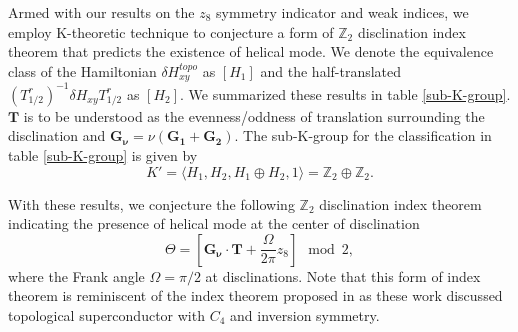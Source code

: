 

Armed with our results on the $z_8$ symmetry indicator and weak indices, we employ K-theoretic technique to conjecture a form of $\mathbb{Z}_2$ disclination index theorem that predicts the existence of helical mode. We denote the equivalence class of the Hamiltonian $\delta H_{xy}^{topo}$ as $[ H_1 ]$ and the half-translated $(T_{1/2}^{r})^{-1} \delta H_{xy} T_{1/2}^r$ as $[ H_2 ]$. We summarized these results in table \ref{sub-K-group}. $\mathbf{T}$ is to be understood as the evenness/oddness of translation surrounding the disclination and $\mathbf{G_{\nu}} = \nu (\mathbf{G_1} + \mathbf{G_2})$. The sub-K-group for the classification in table \ref{sub-K-group} is given by
\begin{equation}
    K' = \langle H_1, H_2, H_1 \oplus H_2, 1 \rangle = \mathbb{Z}_2 \oplus \mathbb{Z}_2 .
\end{equation}

With these results, we conjecture the following $\mathbb{Z}_2$ disclination index theorem indicating the presence of helical mode at the center of disclination
\begin{equation}
    \Theta = \left[ \mathbf{G_{\nu}} \cdot \mathbf{T} + \frac{\Omega}{2 \pi} z_8 \right] \mod 2 ,
\end{equation}
where the Frank angle $\Omega = \pi / 2$ at disclinations. Note that this form of index theorem is reminiscent of the index theorem proposed in \cite{Teo_2013, Teo_disclination_2014} as these work discussed topological superconductor with $C_4$ and inversion symmetry. 

